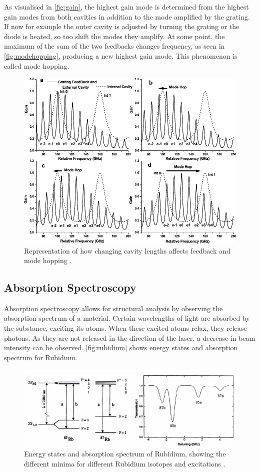 As visualised in \autoref{fig:gain}, the highest gain mode is determined from the highest gain modes from both cavities in addition
to the mode amplified by the grating.
If now for example the outer cavity is adjusted by turning the grating or the diode is heated, so too shift the modes they amplify.
At some point, the maximum of the sum of the two feedbacks changes frequency, as seen in \autoref{fig:modehopping},
producing a new highest gain mode.
This phenomenon is called mode hopping.

\begin{figure}[H]
    \centering
    \includegraphics{figures/modehopping.pdf}
    \caption{Representation of how changing cavity lengths affects feedback and mode hopping \cite{teachspin}.}
    \label{fig:modehopping}
\end{figure}


\subsection{Absorption Spectroscopy}

Absorption spectroscopy allows for structural analysis by observing the absorption spectrum of a material.
Certain wavelengths of light are absorbed by the substance, exciting its atoms.
When these excited atoms relax, they release photons.
As they are not released in the direction of the laser, a decrease in beam intensity can be observed.
\autoref{fig:rubidium} shows energy states and absorption spectrum for Rubidium.

\begin{figure}[H]
    \centering
    \includegraphics{figures/absorption_spectroscopy.pdf}
    \caption{Energy states and absorption spectrum of Rubidium, showing the different minima for different Rubidium isotopes and excitations \cite{teachspin}.}
    \label{fig:rubidium}
\end{figure}


